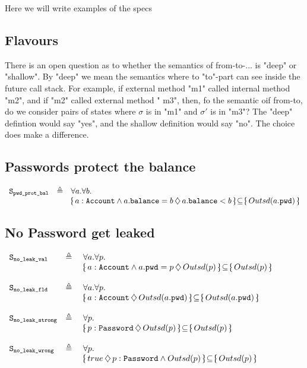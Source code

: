 Here we will write examples of the specs


\subsection{Flavours}

There is an open question as to whether the semantics of from-to-... is "deep" or "shallow". By "deep" we mean the semantics where to "to"-part can see inside the future call stack. For example, if external method "m1" called internal  method "m2", and if "m2" called external method " m3", then, fo the semantic oif from-to, do we consider pairs of states where $\sigma$ is in "m1" and $\sigma'$ is in "m3"?  The "deep" defintion would say "yes", and the shallow definition would say "no". The choice does make a difference.

\subsection{Passwords protect the balance}

$\begin{array}{lll}
 \Spec{{pwd\_prot\_bal}} & \triangleq &  \forall a.  \forall b.\\
 & &   \onlyIf{a:\prg{Account}\wedge a.\prg{balance}=b}{a.\prg{balance}<b} {\outside{a.\prg{pwd}}}   
\end{array}
$



\subsection{No Password get leaked}
$\begin{array}{lll}
 \Spec{no\_leak\_val} & \triangleq &  \forall a.  \forall p.\\
 & &   \onlyIf{a:\prg{Account}\wedge a.\prg{pwd}=p}{\outside{p}} {\outside{p}}\   
~ \\
\\
 \Spec{no\_leak\_fld} & \triangleq &  \forall a.  \forall p.\\
 & &   \onlyIf{a:\prg{Account}}{\outside{a.\prg{pwd}}} {\outside{a.\prg{pwd}}}\   
~ \\
\\
 \Spec{no\_leak\_strong} & \triangleq &  \forall p.\\
 & &   \onlyIf{p:\prg{Password}} {\outside{p}} {\outside{p}}\  \\
 ~ \\
 \Spec{no\_leak\_wrong} & \triangleq\ & \forall p. \\
 & &    \onlyIf{true} {p:\prg{Password} \wedge \outside{p}} {\outside{p}} 

\end{array}
$

